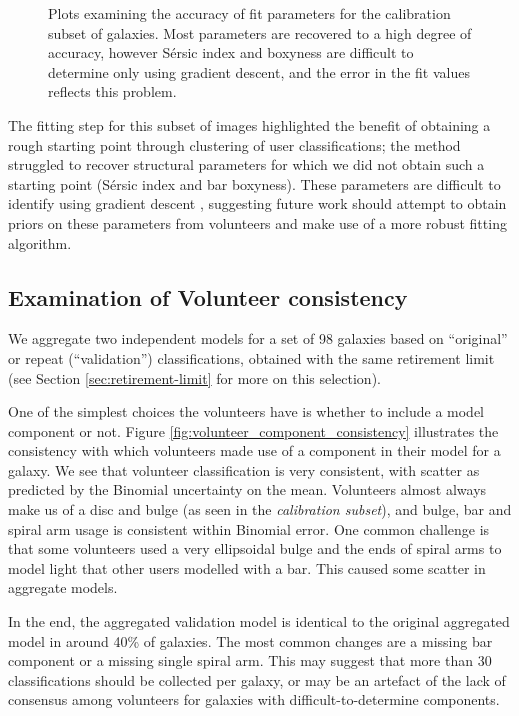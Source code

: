 \documentclass[../main.tex]{subfiles}
\begin{document}
\begin{figure*}
  \caption{Plots examining the accuracy of fit parameters for the calibration subset of galaxies. Most parameters are recovered to a high degree of accuracy, however S\'ersic index and boxyness are difficult to determine only using gradient descent, and the error in the fit values reflects this problem.}
  \label{fig:calibration_parameter_recovery}
\end{figure*}

The fitting step for this subset of images highlighted the benefit of obtaining a rough starting point through clustering of user classifications; the method struggled to recover structural parameters for which we did not obtain such a starting point (S\'ersic index and bar boxyness). These parameters are difficult to identify using gradient descent \citep{2012MNRAS.421.2277L}, suggesting future work should attempt to obtain priors on these parameters from volunteers and make use of a more robust fitting algorithm.

\subsection{Examination of Volunteer consistency}
We aggregate two independent models for a set of 98 galaxies based on ``original'' or repeat (``validation'') classifications, obtained with the same retirement limit (see Section \ref{sec:retirement-limit} for more on this selection).

One of the simplest choices the volunteers have is whether to include a model component or not. Figure \ref{fig:volunteer_component_consistency} illustrates the consistency with which volunteers made use of a component in their model for a galaxy. We see that volunteer classification is very consistent, with scatter as predicted by the Binomial uncertainty on the mean. Volunteers almost always make us of a disc and bulge (as seen in the \textit{calibration subset}), and bulge, bar and spiral arm usage is consistent within Binomial error. One common challenge is that some volunteers used a very ellipsoidal bulge and the ends of spiral arms to model light that other users modelled with a bar. This caused some scatter in aggregate models.

In the end, the aggregated validation model is identical to the original aggregated model in around 40\% of galaxies. The most common changes are a missing bar component or a missing single spiral arm. This may suggest that more than 30 classifications should be collected per galaxy, or may be an artefact of the lack of consensus among volunteers for galaxies with difficult-to-determine components.
\end{document}

